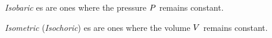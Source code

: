 \begin{definition}[Isobaric]\label{def:Isobaric}
  \emph{Isobaric} es are ones where the pressure $P$ remains constant.
\end{definition}

\begin{definition}[Isometric]\label{def:Isometric}
  \emph{Isometric} (\emph{Isochoric}) es are ones where the volume $V$ remains constant.
\end{definition}

